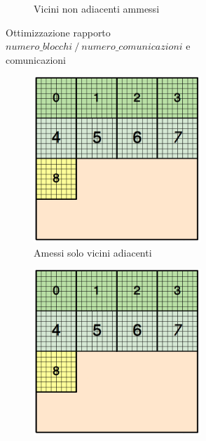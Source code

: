 {\begin{figure}[H]
\begin{subfigure}{1.0\textwidth}
\begin{subfigure}{0.5\textwidth}
			Vicini non adiacenti ammessi
		\end{subfigure}
	\caption{Ottimizzazione rapporto $numero\_blocchi\mathbin{/}numero\_comunicazioni$ e comunicazioni\newline}
	\label{fig:nb_comm}
	\end{subfigure}
	\begin{subfigure}{1.0\textwidth}
	\centering
		\begin{subfigure}{0.5\textwidth}
			\centering
			\includegraphics[width=0.9\textwidth]{immagini/block_on_grid.png}
			Amessi solo vicini adiacenti
		\end{subfigure}%
		\begin{subfigure}{0.5\textwidth}
			\centering
			\includegraphics[width=0.9\textwidth]{immagini/block_on_grid.png}

\end{subfigure}
\end{subfigure}
\end{figure}}
